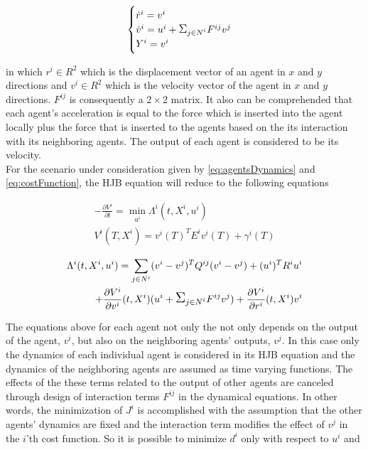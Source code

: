 \documentclass[conference]{IEEEtran}
\begin{document}
\begin{equation}\label{eq:agentsDynamics}
  \begin{cases}
  \dot{r}^{i}=v^{i}\\
  \dot{v}^{i}=u^{i}+\mathlarger{\mathlarger{\Sigma}}_{j \in N^{i}} F^{ij}v^{j}\\
  Y^{i}=v^{i}
  \end{cases}
\end{equation}

in which $r^{i} \in R^2$ which is the displacement vector of an agent in $x$ and $y$ directions and $v^{i} \in R^2$ which is the velocity vector of the agent in $x$ and $y$ directions. $F^{ij}$ is consequently a $2\times 2 $ matrix. It also can be comprehended that each agent's acceleration is equal to the force which is inserted into the agent locally plus the force that is inserted to the agents based on the its interaction with its neighboring agents. The output of each agent is considered to be its velocity.\\

For the scenario under consideration given by \ref{eq:agentsDynamics} and \ref{eq:costFunction}, the HJB equation will reduce to the following equations


\begin{equation}\label{eq:HJB1Specific}
\begin{split}
-\frac{\partial V^{i}}{\partial t}=\displaystyle \min_{u^{i}} \Lambda^{i}(t,X^{i},u^{i})\\
V^{i}(T,X^{i})=v^{i}(T)^{T}E^{i}v^{i}(T)+\gamma^{i}(T)
\end{split}
\end{equation}


\begin{equation}\label{eq:HJB3Specific}
\begin{split}
\Lambda^{i}(t,X^{i},u^{i})=\sum_{j \in N^{i}}(v^{i}-v^{j})^{T}Q^{ij}(v^{i}-v^{j})+(u^{i})^{T}R^{i}u^{i}\\
+\frac{\partial V^{i}}{\partial v^{i}}(t,X^{i})(u^{i}+\mathlarger{\mathlarger{\Sigma}}_{j \in N^{i}} F^{ij}v^{j})+
\frac{\partial V^{i}}{\partial r^{i}}(t,X^{i})v^{i}
\end{split}
\end{equation}

The equations above for each agent not only the not only depends on the output of the agent, $v^{i}$, but also on the neighboring agents' outputs, $v^{j}$. In this case only the dynamics of each individual agent is considered in its HJB equation and the dynamics of the neighboring agents are assumed as time varying functions. The effects of the these terms related to the output of other agents are canceled through design of interaction terms $F^{ij}$ in the dynamical equations. In other words, the minimization of $J^{i}$ is accomplished with the assumption that the other agents' dynamics are fixed and the interaction term modifies the effect of $v^{j}$ in the $i$'th cost function. So it is possible to minimize $d^{i}$ only with respect to $u^{i}$ and
\end{document}
